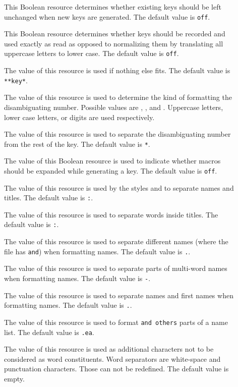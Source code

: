 \documentclass[11pt,a4paper]{scrbook}
\begin{document}
\begin{description}
  \item []
        This Boolean resource determines whether existing keys should
        be left unchanged when new keys are generated.
        The default value is \verb|off|.
  \item []
        This Boolean resource determines whether keys should be recorded and
        used exactly as read as opposed to normalizing them by translating all
        uppercase letters to lower case.  The default value is \verb|off|.
  \item []
        The value of this resource is used if nothing else fits.
        The default value is \verb|**key*|.
  \item []
        The value of this resource is used to determine the kind of formatting
        the disambiguating number. Possible values are ,
        , and . Uppercase letters, lower case letters,
        or digits are used respectively.
  \item []
        The value of this resource is used to separate the disambiguating
        number from the rest of the key.
        The default value is \verb|*|.
  \item []
        The value of this Boolean resource is used to indicate whether
        macros should be expanded while generating a key.
        The default value is \verb|off|.
  \item []
        The value of this resource is used by the styles  and
         to separate names and titles.
        The default value is \verb|:|.
  \item []
        The value of this resource is used to separate words inside titles.
        The default value is \verb|:|.
  \item []
        The value of this resource is used to separate different names (where
        the \BibTeX{} file has \verb|and|) when formatting names.
        The default value is \verb|.|.
  \item []
        The value of this resource is used to separate parts of multi-word
        names when formatting names.
        The default value is \verb|-|.
  \item []
        The value of this resource is used to separate names and first names
        when formatting names.
        The default value is \verb|.|.
  \item []
        The value of this resource is used to format \verb|and others| parts
        of a name list.
        The default value is \verb|.ea|.
  \item []
        The value of this resource is used as additional characters not to be
        considered as word constituents. Word separators are white-space and
        punctuation characters. Those can not be redefined.
        The default value is empty. 
\end{description}
\end{document}

